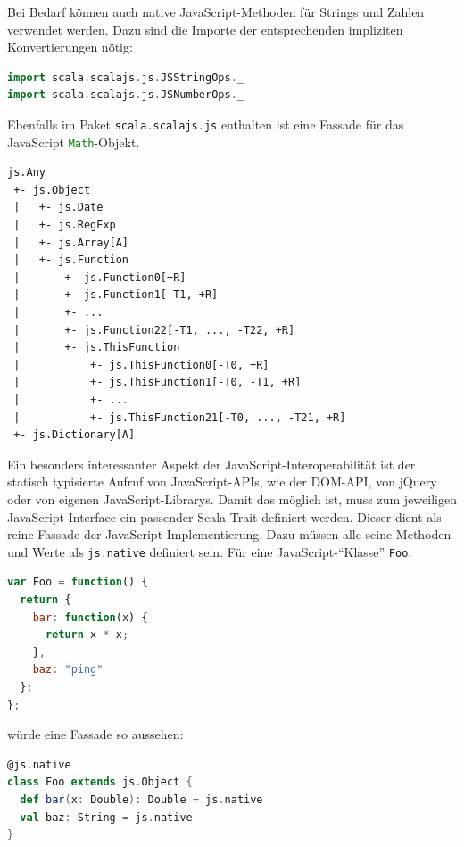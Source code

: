 \documentclass[a4paper, 12pt, hidelinks, listof=totoc, listoftables=totoc, bibliography=totoc]{scrreprt}
\newcommand{\code}[1]{\lstinline[language=Scala, style=inline]|#1|}
\newcommand{\scala}[1]{\lstinline[language=Scala, style=inline]|#1|}
\newcommand{\js}[1]{\lstinline[language=JavaScript, style=inline]|#1|}
\begin{document}
Bei Bedarf können auch native JavaScript-Methoden für Strings und Zahlen verwendet werden. Dazu sind die Importe der entsprechenden impliziten Konvertierungen nötig:
\begin{lstlisting}[language=Scala, style=snippet]
import scala.scalajs.js.JSStringOps._
import scala.scalajs.js.JSNumberOps._
\end{lstlisting}

Ebenfalls im Paket \scala{scala.scalajs.js} enthalten ist eine Fassade für das JavaScript \js{Math}-Objekt.

\begin{minipage}{\linewidth}
\begin{lstlisting}[caption={Scala.js-Typhierarchie für vordefinierte JavaScript-Typen. \cite{scalajs.DCJ}}, label={code:sjs-js-types}]
js.Any
 +- js.Object
 |   +- js.Date
 |   +- js.RegExp
 |   +- js.Array[A]
 |   +- js.Function
 |       +- js.Function0[+R]
 |       +- js.Function1[-T1, +R]
 |       +- ...
 |       +- js.Function22[-T1, ..., -T22, +R]
 |       +- js.ThisFunction
 |           +- js.ThisFunction0[-T0, +R]
 |           +- js.ThisFunction1[-T0, -T1, +R]
 |           +- ...
 |           +- js.ThisFunction21[-T0, ..., -T21, +R]
 +- js.Dictionary[A]
\end{lstlisting}
\end{minipage} 


Ein besonders interessanter Aspekt der JavaScript-Interoperabilität ist der statisch typisierte Aufruf von JavaScript-\ac{API}s, wie der \ac{DOM}-\ac{API}, von jQuery oder von eigenen JavaScript-Librarys. Damit das möglich ist, muss zum jeweiligen JavaScript-Interface ein passender Scala-Trait definiert werden. Dieser dient als reine Fassade der JavaScript-Implementierung. Dazu müssen alle seine Methoden und Werte als \scala{js.native} definiert sein. Für eine JavaScript-"`Klasse"' \code{Foo}:

\begin{lstlisting}[language=JavaScript, style=snippet]
var Foo = function() {
  return {
    bar: function(x) {
      return x * x;
    },
    baz: "ping"
  };
};
\end{lstlisting}

würde eine Fassade so aussehen:

\begin{lstlisting}[language=Scala, style=snippet]
@js.native
class Foo extends js.Object {
  def bar(x: Double): Double = js.native
  val baz: String = js.native
}
\end{lstlisting}
\end{document}
